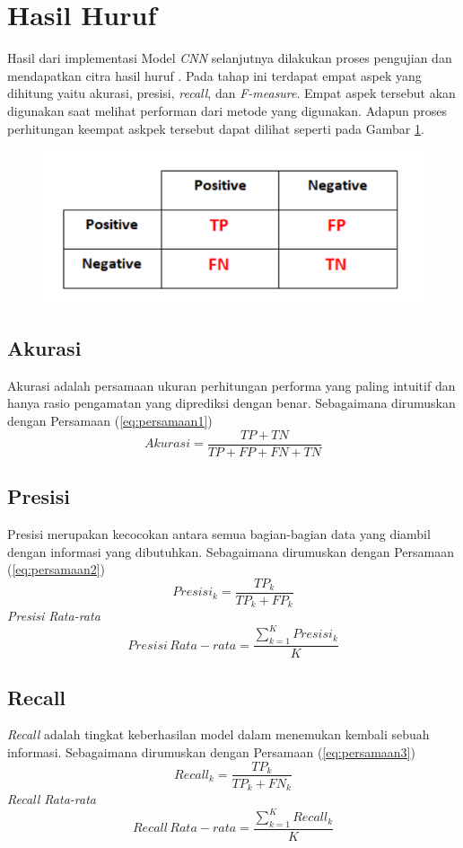 \section{Hasil Huruf}
Hasil dari implementasi Model \textit{CNN} selanjutnya dilakukan proses pengujian dan mendapatkan citra hasil huruf . Pada tahap ini terdapat empat aspek yang dihitung yaitu akurasi, presisi, \textit{recall}, dan \emph {F-measure}. Empat aspek tersebut akan digunakan saat melihat performan dari metode yang digunakan. Adapun proses perhitungan keempat askpek tersebut dapat dilihat seperti pada Gambar \ref{fig:MATRIKSKONFUSI}.
\begin{figure}[hbt!]
	\includegraphics[width=0.7\linewidth]{gambar/bener/Nilai-Konfusi-Matriks.png}
	\label{fig:MATRIKSKONFUSI}
\end{figure}

\subsection{Akurasi}
Akurasi adalah persamaan ukuran perhitungan performa yang paling intuitif dan hanya rasio pengamatan yang diprediksi dengan benar. Sebagaimana dirumuskan dengan Persamaan (\ref{eq:persamaan1})
\begin{equation}\label{eq:persamaan1}
Akurasi=\frac{TP+TN}{TP+FP+FN+TN}
\end{equation}
\subsection{Presisi}
Presisi merupakan kecocokan antara semua bagian-bagian data yang diambil dengan informasi yang dibutuhkan. Sebagaimana dirumuskan dengan Persamaan (\ref{eq:persamaan2})
\begin{equation}\label{eq:persamaan2}
Presisi_k=\frac{TP_k}{TP_k+FP_k}
\end{equation} 
{\it Presisi Rata-rata}
\begin{equation}\label{eq:persamaan3}
Presisi \, Rata-rata=\frac{\sum_{k=1}^K Presisi_k}{K}
\end{equation} 
\subsection{Recall}
\textit{Recall} adalah tingkat keberhasilan model dalam menemukan
kembali sebuah informasi. Sebagaimana dirumuskan dengan Persamaan (\ref{eq:persamaan3})
\begin{equation}\label{eq:persamaan4}
Recall_k=\frac{TP_k}{TP_k+FN_k}
\end{equation} 
{\it Recall Rata-rata}
\begin{equation}\label{eq:persamaan5}
Recall \, Rata-rata=\frac{\sum_{k=1}^K Recall_k}{K}
\end{equation} 
